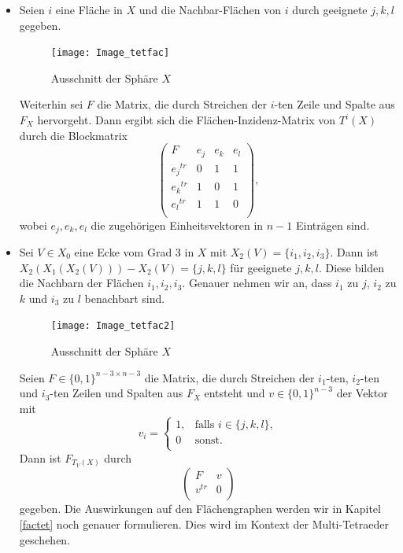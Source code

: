 \documentclass[12pt,titlepage,twoside,cleardoublepage]{article}
\theoremstyle{nummermitklammern}
\numberwithin{equation}{section}
\begin{document}
\begin{enumerate}
\begin{itemize}
\item Seien $i$ eine Fläche in $X$ und die Nachbar-Flächen von $i$ durch geeignete $j,k,l$ gegeben.
\begin{figure}[H]
\begin{center}
\texttt{[image: Image\_tetfac]}
\end{center}
\caption{Ausschnitt der Sphäre $X$}
\end{figure}
Weiterhin sei $F$ die Matrix, die durch Streichen der $i$-ten Zeile und Spalte aus $F_X$ hervorgeht. Dann ergibt sich die Flächen-Inzidenz-Matrix von $T^i(X)$ durch die Blockmatrix
\[
\left( 
\begin{array}{c|ccc} 
  F & e_j& e_k &e_l \\ 
  \hline 
  {e_j}^{tr} & 0 & 1 & 1  \\
  {e_k}^{tr} & 1 & 0 & 1 \\
  {e_l}^{tr} & 1 & 1 & 0 \\
\end{array} 
\right),
\]
wobei $e_j,e_k,e_l$ die zugehörigen Einheitsvektoren in $n-1$ Einträgen sind. 
\item Sei $V\in X_0$ eine Ecke vom Grad 3 in $X$ mit $X_2(V)=\{i_1,i_2,i_3\}.$ Dann ist $X_2(X_1(X_2(V)))-X_2(V)=\{j,k,l\}$ für geeignete $j,k,l$. Diese bilden die Nachbarn der Flächen $i_1,i_2,i_3.$ Genauer nehmen wir an, dass $i_1$ zu $j$, $i_2$ zu $k$ und $i_3$ zu $l$ benachbart sind.
\begin{figure}[H]
\begin{center}
\texttt{[image: Image\_tetfac2]}
\end{center}
\caption{Ausschnitt der Sphäre $X$}
\end{figure}  
Seien $F\in \{0,1\}^{n-3\times n-3}$ die Matrix, die durch Streichen der $i_1$-ten, $i_2$-ten und $i_3$-ten Zeilen und Spalten  aus $F_X$ entsteht und $v\in \{0,1\}^{n-3}$ der Vektor mit
\[
v_{i}=
\begin{cases}
1,&\text{falls }i\in \{j,k,l\}, \\
0& \text{sonst.}\\
\end{cases}
\] Dann ist $F_{T_V(X)}$ durch 
\[
\left( 
\begin{array}{c|ccc} 
  F & v \\ 
  \hline 
  {v}^{tr} & 0\\
\end{array} 
\right)
\]
gegeben.
Die Auswirkungen auf den Flächengraphen werden wir in Kapitel  \ref{factet} noch genauer formulieren. Dies wird im Kontext der Multi-Tetraeder geschehen.
\end{itemize}
\end{enumerate}
\newpage
\end{document}
